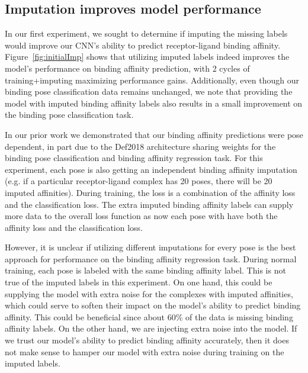 \documentclass[journal=jmcmar,manuscript=article]{achemso}
\begin{document}
\subsection{Imputation improves model performance}
In our first experiment, we sought to determine if imputing the missing labels would improve our CNN's ability to predict receptor-ligand binding affinity.
Figure~\ref{fig:initialImp} shows that utilizing imputed labels indeed improves the model's performance on binding affinity prediction, with 2 cycles of training+imputing maximizing performance gains.
Additionally, even though our binding pose classification data remains unchanged, we note that providing the model with imputed binding affinity labels also results in a small improvement on the binding pose classification task.

In our prior work we demonstrated that our binding affinity predictions were pose dependent, in part due to the Def2018 architecture sharing weights for the binding pose classification and binding affinity regression task\cite{crossdocked2020}.
For this experiment, each pose is also getting an independent binding affinity imputation (e.g. if a particular receptor-ligand complex has 20 poses, there will be 20 imputed affinities).
During training, the loss is a combination of the affinity loss and the classification loss.
The extra imputed binding affinity labels can supply more data to the overall loss function as now each pose with have both the affinity loss and the classification loss.

However, it is unclear if utilizing different imputations for every pose is the best approach for performance on the binding affinity regression task.
During normal training, each pose is labeled with the same binding affinity label.
This is not true of the imputed labels in this experiment.
On one hand, this could be supplying the model with extra noise for the complexes with imputed affinities, which could serve to soften their impact on the model's ability to predict binding affinity.
This could be beneficial since about 60\% of the data is missing binding affinity labels.
On the other hand, we are injecting extra noise into the model.
If we trust our model's ability to predict binding affinity accurately, then it does not make sense to hamper our model with extra noise during training on the imputed labels.
\end{document}
